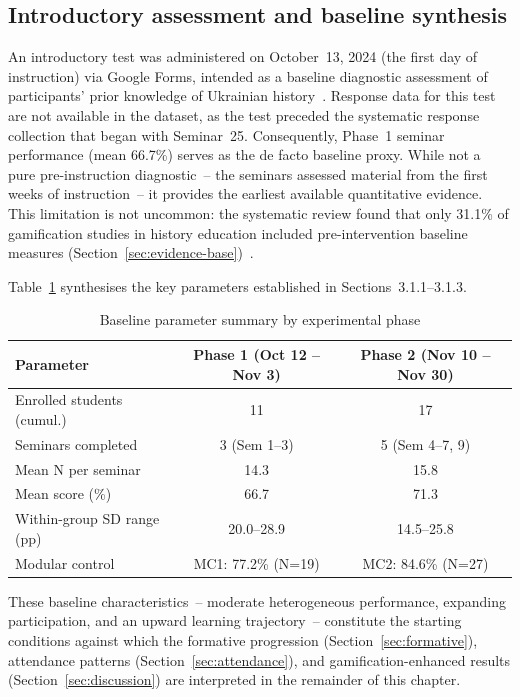 \subsection{Introductory assessment and baseline synthesis}

An introductory test was administered on October~13, 2024 (the first day of instruction) via Google Forms, intended as a baseline diagnostic assessment of participants' prior knowledge of Ukrainian history~\cite{Hattie2009, Clark2016}. Response data for this test are not available in the dataset, as the test preceded the systematic response collection that began with Seminar~25. Consequently, Phase~1 seminar performance (mean 66.7\%) serves as the de facto baseline proxy. While not a pure pre-instruction diagnostic~-- the seminars assessed material from the first weeks of instruction~-- it provides the earliest available quantitative evidence. This limitation is not uncommon: the systematic review found that only 31.1\% of gamification studies in history education included pre-intervention baseline measures (Section~\ref{sec:evidence-base})~\cite{Korniienko2025mrqs}.

Table~\ref{tab:baseline-summary} synthesises the key parameters established in Sections~3.1.1--3.1.3.

\begin{table}[!h]
\centering
\caption{Baseline parameter summary by experimental phase}
\label{tab:baseline-summary}
\small
\begin{tabular}{lcc}
\hline
\textbf{Parameter} & \textbf{Phase 1 (Oct 12 -- Nov 3)} & \textbf{Phase 2 (Nov 10 -- Nov 30)} \\
\hline
Enrolled students (cumul.) & 11 & 17 \\
Seminars completed & 3 (Sem 1--3) & 5 (Sem 4--7, 9) \\
Mean N per seminar & 14.3 & 15.8 \\
Mean score (\%) & 66.7 & 71.3 \\
Within-group SD range (pp) & 20.0--28.9 & 14.5--25.8 \\
Modular control & MC1: 77.2\% (N=19) & MC2: 84.6\% (N=27) \\
\hline
\end{tabular}
\end{table}

These baseline characteristics~-- moderate heterogeneous performance, expanding participation, and an upward learning trajectory~-- constitute the starting conditions against which the formative progression (Section~\ref{sec:formative}), attendance patterns (Section~\ref{sec:attendance}), and gamification-enhanced results (Section~\ref{sec:discussion}) are interpreted in the remainder of this chapter.



